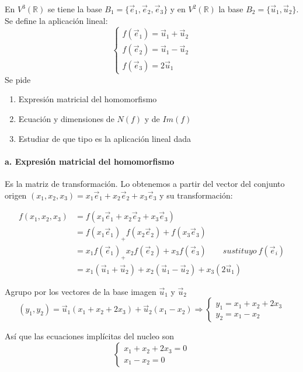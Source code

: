 \begin{problema}{\cite[11p347]{palacios}}{
	En $V^3(\mathbb{R})$ se tiene la base $B_1=\{\vec{e}_1,\vec{e}_2,\vec{e}_3\}$ y en
	$V^2(\mathbb{R})$ la base $B_2=\{\vec{u}_1,\vec{u}_2\}$. Se define la aplicación lineal:
	$$
	\begin{cases}
		f(\vec{e}_1) = \vec{u}_1 + \vec{u}_2 \\
		f(\vec{e}_2) = \vec{u}_1 - \vec{u}_2 \\
		f(\vec{e}_3) = 2\vec{u}_1
	\end{cases}
	$$
	Se pide
	\begin{enumerate}
	\item Expresión matricial del homomorfismo
	\item Ecuación y dimensiones de $N(f)$ y de $Im(f)$
	\item Estudiar de que tipo es la aplicación lineal dada
	\end{enumerate}
	}

	\paragraph{a. Expresión matricial del homomorfismo} Es la matriz de transformación. 
	Lo obtenemos a partir del vector del conjunto origen
	$(x_1,x_2,x_3)=x_1\vec{e}_1+x_2\vec{e}_2+x_3\vec{e}_3$ y su transformación:

	\begin{align*}
		f(x_1,x_2,x_3) 	&= f(x_1\vec{e}_1+x_2\vec{e}_2+x_3\vec{e}_3) \\
						&= f(x_1\vec{e}_1)_+f(x_2\vec{e}_2)+f(x_3\vec{e}_3) \\
						&= x_1 f(\vec{e}_1)_+x_2 f(\vec{e}_2)+x_3 f(\vec{e}_3)
						\qquad\scriptstyle{sustituyo}\ f(\vec{e}_i)\\
						&= x_1 (\vec{u}_1+\vec{u}_2)+x_2(\vec{u}_1-\vec{u}_2)+x_3(2\vec{u}_1)
	\end{align*}

	Agrupo por los vectores de la base imagen $\vec{u}_1$ y $\vec{u}_2$
	$$(y_1,y_2)=\vec{u}_1(x_1+x_2+2x_3)+\vec{u}_2(x_1-x_2) \Rightarrow
	\begin{cases}
		y_1=x_1+x_2+2x_3 \\
		y_2=x_1-x_2
	\end{cases}$$

	Así que las ecuaciones implícitas del nucleo son
	$$\begin{cases}
		x_1+x_2+2x_3=0 \\
		x_1-x_2=0
	\end{cases}$$


\end{problema}
